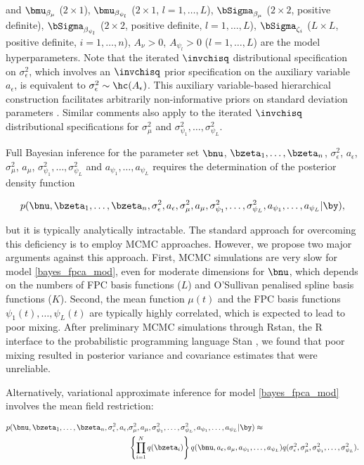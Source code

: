 \documentclass[12pt]{article}
\def\sigsqeps{\sigma^2_{\epsilon}}
\def\aeps{a_{\epsilon}}
\def\sigsqmu{\sigma^2_{\mu}}
\def\amu{a_{\mu}}
\newcommand\sigsqpsi[1]{\sigma^2_{\psi_{#1}}}
\newcommand\apsi[1]{a_{\psi_{#1}}}
\theoremstyle{plain}
\theoremstyle{definition}
\theoremstyle{remark}
\begin{document}
\noindent and $\bmu_{\beta_\mu}$ ($2 \times 1$), $\bmu_{\beta_{\psi_l}}$ ($2 \times 1$, $l = 1, \dots, L$),
$\bSigma_{\beta_\mu}$ ($2 \times 2$, positive definite), $\bSigma_{\beta_{\psi_l}}$ ($2 \times 2$, positive definite,
$l = 1, \dots, L$), $\bSigma_{\zeta_i}$ ($L \times L$, positive definite, $i = 1, \dots, n$), $A_\nu > 0$,
$A_{\psi_l} > 0$ ($l = 1, \dots, L$) are the model hyperparameters.
Note that the iterated $\invchisq$ distributional specification on $\sigsqeps$,
which involves an $\invchisq$ prior specification on the auxiliary variable $\aeps$, is equivalent to $\sigsqeps \sim
\hc (A_{\epsilon})$. This auxiliary variable-based hierarchical construction facilitates arbitrarily non-informative
priors on standard deviation parameters \cite{gelman06}. Similar comments also apply to the iterated $\invchisq$
distributional specifications for $\sigsqmu$ and $\sigsqpsi{1}, \dots, \sigsqpsi{L}$.

Full Bayesian inference for the parameter set $\bnu$, $\bzeta_1, \dots, \bzeta_n$, $\sigsqeps$, $\aeps$,
$\sigsqmu$, $\amu$, $\sigsqpsi{1}, \dots, \sigsqpsi{L}$ and $\apsi{1}, \dots, \apsi{L}$ requires the determination
of the posterior density function

\[
	p (
		\bnu, \bzeta_1, \dots, \bzeta_n, \sigsqeps, \aeps, \sigsqmu, \amu,
		\sigsqpsi{1}, \dots, \sigsqpsi{L}, \apsi{1}, \dots, \apsi{L} | \by
	),
\]

\noindent but it is typically analytically intractable. The standard approach for overcoming this deficiency is to
employ MCMC approaches. However, we propose two major arguments against this approach. First, MCMC
simulations are very slow for model \eqref{bayes_fpca_mod}, even for moderate dimensions for $\bnu$, which
depends on the numbers of FPC basis functions ($L$) and O'Sullivan penalised spline basis functions ($K$).
Second, the mean function $\mu (t)$ and the FPC basis functions $\psi_1 (t), \dots,
\psi_L (t)$ are typically highly correlated, which is expected to lead to poor mixing. After preliminary MCMC
simulations through \textsf{Rstan}, the \textsf{R} \cite{r20} interface to the probabilistic programming language
\textsf{Stan} \cite{rstan20}, we found that poor mixing resulted in posterior variance and covariance estimates
that were unreliable.

Alternatively, variational approximate inference for model \eqref{bayes_fpca_mod} involves
the mean field restriction:

\begin{align}
\begin{split}
	p (
		\bnu, \bzeta_1, \dots, \bzeta_n, \sigsqeps, \aeps, &\sigsqmu, \amu,
		\sigsqpsi{1}, \dots, \sigsqpsi{L}, \apsi{1}, \dots, \apsi{L} | \by
	) \approx \\
		&\left\{ \prod_{i=1}^N q (\bzeta_i) \right\} q (\bnu, \aeps, \amu, \apsi{1}, \dots, \apsi{L})
		q(\sigsqeps, \sigsqmu, \sigsqpsi{1}, \dots, \sigsqpsi{L}).
\end{split}
\label{fpca_mf_min_restrn}
\end{align}
\end{document}
